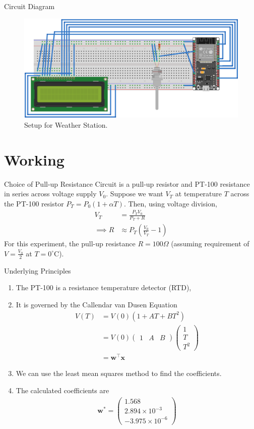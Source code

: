 \documentclass{beamer}
\providecommand{\brak}[1]{\ensuremath{\left(#1\right)}}
\theoremstyle{remark}
\newcommand{\myvec}[1]{\ensuremath{\begin{pmatrix}#1\end{pmatrix}}}
\renewcommand{\vec}[1]{\mathbf{\boldsymbol{#1}}}
\begin{document}
\begin{frame}{Circuit Diagram}
    \begin{figure}[!ht]
        \centering
        \includegraphics[width=0.6\columnwidth]{figs/esp32.png}
        \caption{Setup for Weather Station.}
        \label{fig:setup}
    \end{figure}
\end{frame}

\section{Working}
\begin{frame}{Choice of Pull-up Resistance}
    Circuit is a pull-up resistor and PT-100 resistance in series across 
    voltage supply $V_0$.
    Suppose we want $V_T$ at temperature $T$ across the PT-100 resistor 
    $P_T = P_0\brak{1+\alpha T}$. Then, using voltage division,
    \begin{align}
        V_T &= \frac{P_TV_0}{P_T + R} \\
        \implies R &\approx P_T\brak{\frac{V_0}{V_T} - 1}
        \label{eq:R-est}
    \end{align}
    For this experiment, the pull-up resistance $R = 100 \Omega$ (assuming requirement of $V = \frac{V_0}{2}$ at $T = 0^{\circ}$C).
\end{frame}

\begin{frame}{Underlying Principles}
    \begin{enumerate}
        \item The PT-100 is a resistance temperature detector (RTD),
        \item It is governed by the Callendar van Dusen Equation
        \begin{align}
            V(T) &= V(0)\brak{1 + AT + BT^2} \\
                 &= V(0)\myvec{1&A&B}\myvec{1\\T\\T^2} \\
                 &= \vec{w}^\top\vec{x}
        \end{align}
        \item We can use the least mean squares method to find the coefficients.
        \item The calculated coefficients are
        \begin{align}
            \vec{w^*} = \myvec{1.568\\2.894 \times 10^{-3} \\ -3.975 \times 10^{-6}}
        \end{align}
    \end{enumerate}
\end{frame}
\end{document}
